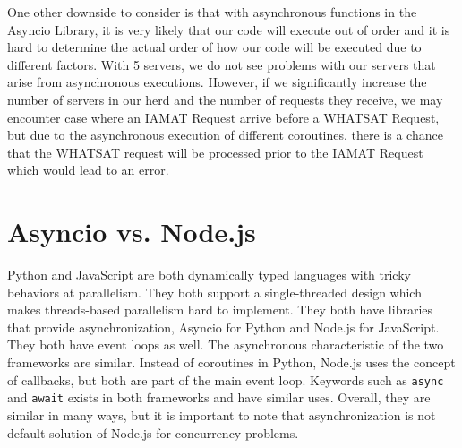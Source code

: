 One other downside to consider is that with asynchronous functions in the Asyncio Library, it is very likely that our code will execute out of order and it is hard to determine the actual order of how our code will be executed due to different factors. With 5 servers, we do not see problems with our servers that arise from asynchronous executions. However, if we significantly increase the number of servers in our herd and the number of requests they receive, we may encounter case where an IAMAT Request arrive before a WHATSAT Request, but due to the asynchronous execution of different coroutines, there is a chance that the WHATSAT request will be processed prior to the IAMAT Request which would lead to an error. 
\section{Asyncio vs. Node.js}
Python and JavaScript are both dynamically typed languages with tricky behaviors at parallelism. They both support a single-threaded design which makes threads-based parallelism hard to implement. They both have libraries that provide asynchronization, Asyncio for Python and Node.js for JavaScript. They both have event loops as well. The asynchronous characteristic of the two frameworks are similar. Instead of coroutines in Python, Node.js uses the concept of callbacks, but both are part of the main event loop. Keywords such as \texttt{async} and \texttt{await} exists in both frameworks and have similar uses. Overall, they are similar in many ways, but it is important to note that asynchronization is not default solution of Node.js for concurrency problems. 
